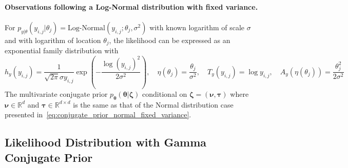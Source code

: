


\paragraph{Observations following a Log-Normal distribution with fixed variance.}
For $p_{{y}\vert{\theta}}({y}_{i,j} \vert {\theta}_j) = \text{Log-Normal}({y}_{i,j};{\theta}_j, \sigma^2)$ with known logarithm of scale $\sigma$ and with logarithm of location $\theta_j$, the likelihood can be expressed as an exponential family distribution with
\begin{equation*}
h_{y}({y}_{i,j} ) = \frac{1}{\sqrt{2\pi}\sigma{y}_{i,j}} \exp\left(-\frac{\log({y}_{i,j})^{2}}{2\sigma^{2}}\right),\quad
\eta(\theta_j) = \frac{\theta_j}{\sigma^{2}},\quad
T_{y}({y}_{i,j} ) = \log {y}_{i,j}  ,\quad
A_{y}(\eta(\theta_j)) = \frac{\theta_j^2}{2\sigma^{2}}
\end{equation*}
The multivariate conjugate prior $p_{\boldsymbol{\theta}}(\boldsymbol{\theta}\vert \boldsymbol{\zeta})$ conditional on $\boldsymbol{\zeta} = (\boldsymbol{\nu}, \boldsymbol{\tau})$ where $\boldsymbol{\nu} \in \mathbb{R}^d$ and $\boldsymbol{\tau} \in \mathbb{R}^{d\times d}$ is the same as that of the Normal distribution case presented in~\eqref{eq:conjugate_prior_normal_fixed_variance}.

%
%


\subsection{Likelihood Distribution with Gamma Conjugate Prior}
